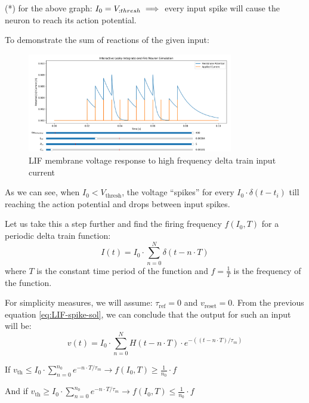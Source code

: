 (*) for the above graph: \( I_0=V_{\text: thresh} \implies \) every input spike will cause the neuron to reach its action potential.

To demonstrate the sum of reactions of the given input:

\begin{figure}[H]
    \centering
    \includegraphics[width=0.8\textwidth]{methods/computational-models/graphs/LIF-high-freq-spike-response-ref.png}
    \caption{LIF membrane voltage response to high frequency delta train input current}
    \label{fig:LIF-high-freq-spike-ref}
\end{figure}

As we can see, when \(I_0 < V_{\text{thresh}}\), the voltage “spikes” for every \(I_0 \cdot \delta(t-t_i)\) till reaching the action potential and drops between input spikes. 

Let us take this a step further and find the firing frequency \(f(I_0, T)\) for a periodic delta train function:
\begin{equation}
I(t) = I_0 \cdot \sum_{n=0}^N \delta(t-n \cdot T)
\end{equation}
where \(T\) is the constant time period of the function and \(f = \frac{1}{T}\) is the frequency of the function.

For simplicity measures, we will assume: \(\tau_{\text{ref}} = 0\) and \(v_{\text{reset}} = 0\).
From the previous equation \ref{eq:LIF-spike-sol}, we can conclude that the output for such an input will be:
\begin{equation}
v(t) = I_0 \cdot \sum_{n=0}^N H(t-n \cdot T) \cdot e^{-((t-n \cdot T)/\tau_m)}
\end{equation}

If \(v_{\text{th}} \leq I_0 \cdot \sum_{n=0}^{n_0} e^{-n \cdot T/\tau_m} \rightarrow f(I_0, T) \geq \frac{1}{n_0} \cdot f\)

And if \(v_{\text{th}} \geq I_0 \cdot \sum_{n=0}^{n_0} e^{-n \cdot T/\tau_m} \rightarrow f(I_0, T) \leq \frac{1}{n_0} \cdot f\)

